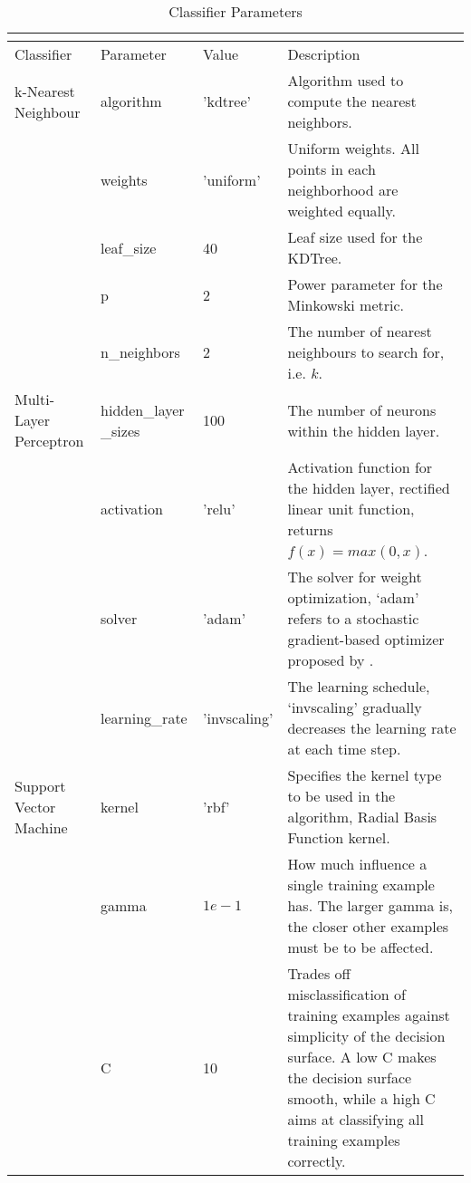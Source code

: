 \begin{small}
\begin{longtable}{@{}p{2cm}p{2.5cm}p{1.7cm}p{6.0cm}@{}}
\caption{Classifier Parameters} \\
\label{params} \\
\toprule
Classifier & Parameter & Value & Description \\ \midrule
k-Nearest Neighbour & algorithm & 'kdtree' & Algorithm used to compute the nearest neighbors. \\
    & weights & 'uniform' &  Uniform weights. All points in each neighborhood are weighted equally. \\
    & leaf\_size & 40 & Leaf size used for the KDTree. \\
    & p & 2 & Power parameter for the Minkowski metric. \\
 & n\_neighbors & 2 & The number of nearest neighbours to search for, i.e. $k$. \\
Multi-Layer Perceptron & hidden\_layer \_sizes & 100 & The number of neurons within the hidden layer. \\
		       & activation & 'relu' & Activation function for the hidden layer, rectified linear unit function, returns \newline $ f(x) = max(0, x) $. \\
	 & solver & 'adam' & The solver for weight optimization, ‘adam’ refers to a stochastic gradient-based optimizer proposed by \cite{kingma2014adam}. \\
  & learning\_rate & 'invscaling' & The learning schedule, ‘invscaling’ gradually decreases the learning rate at each time step. \\
Support Vector Machine & kernel & 'rbf' & Specifies the kernel type to be used in the algorithm, Radial Basis Function kernel. \\
		       & gamma & $ 1e-1 $ & How much influence a single training example has. The larger gamma is, the closer other examples must be to be affected. \\
	 & C & 10 & Trades off misclassification of training examples against simplicity of the decision surface. A low C makes the decision surface smooth, while a high C aims at classifying all training examples correctly. \\ \bottomrule
\end{longtable}
\end{small}
